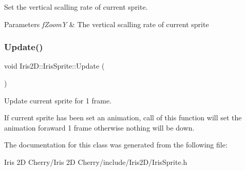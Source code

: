 Set the vertical scalling rate of current sprite. 


\begin{DoxyParams}{Parameters}
{\em f\+ZoomY} & The vertical scalling rate of current sprite \\
\hline
\end{DoxyParams}
\mbox{\label{class_iris2_d_1_1_iris_sprite_a755c2896a54ad43d68db2993477b900a}} 
\subsubsection{\texorpdfstring{Update()}{Update()}}
{\footnotesize\ttfamily void Iris2\+D\+::\+Iris\+Sprite\+::\+Update (\begin{DoxyParamCaption}{ }\end{DoxyParamCaption})}



Update current sprite for 1 frame. 

If current sprite has been set an animation, call of this function will set the animation foraward 1 frame otherwise nothing will be down. 

The documentation for this class was generated from the following file\+:\begin{DoxyCompactItemize}
\item 
Iris 2\+D Cherry/\+Iris 2\+D Cherry/include/\+Iris2\+D/Iris\+Sprite.\+h\end{DoxyCompactItemize}
